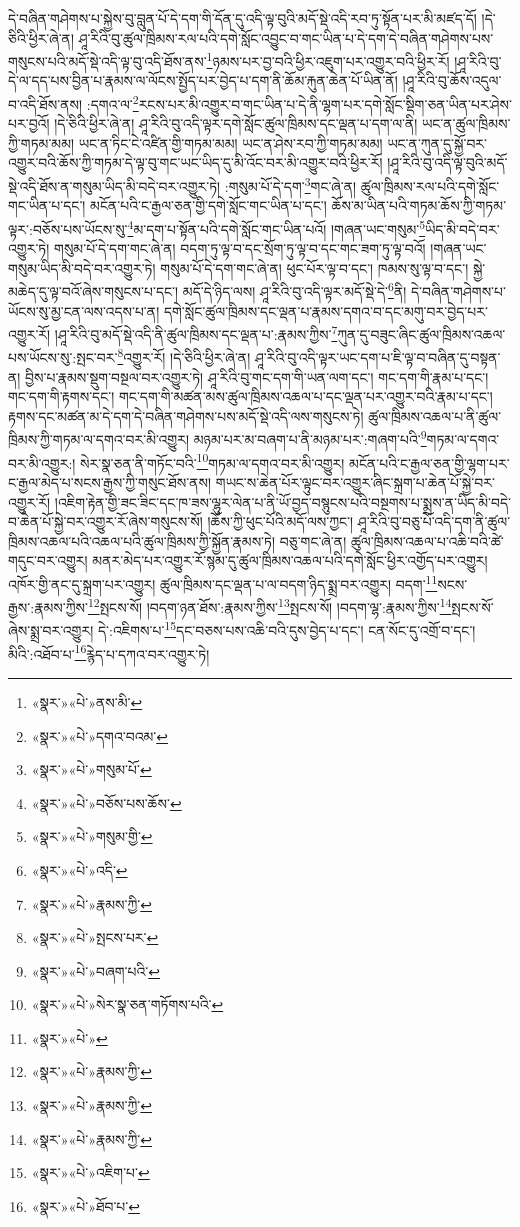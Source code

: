 དེ་བཞིན་གཤེགས་པ་སྐྱེས་བུ་བླུན་པོ་དེ་དག་གི་དོན་དུ་འདི་ལྟ་བུའི་མདོ་སྡེ་འདི་རབ་ཏུ་སྟོན་པར་མི་མཛད་དོ། །དེ་ཅིའི་ཕྱིར་ཞེ་ན། ཤཱ་རིའི་བུ་ཚུལ་ཁྲིམས་རལ་པའི་དགེ་སློང་འབྱུང་བ་གང་ཡིན་པ་དེ་དག་དེ་བཞིན་གཤེགས་པས་གསུངས་པའི་མདོ་སྡེ་འདི་ལྟ་བུ་འདི་ཐོས་ནས་\footnote{«སྣར་»«པེ་»ནས་མི་}ཉམས་པར་བྱ་བའི་ཕྱིར་འཇུག་པར་འགྱུར་བའི་ཕྱིར་རོ། །ཤཱ་རིའི་བུ་དེ་ལ་དད་པས་བྱིན་པ་རྣམས་ལ་ལོངས་སྤྱོད་པར་བྱེད་པ་དག་ནི་ཆོམ་རྐུན་ཆེན་པོ་ཡིན་ནོ། །ཤཱ་རིའི་བུ་ཆོས་འདུལ་བ་འདི་ཐོས་ནས། :དགའ་ལ་\footnote{«སྣར་»«པེ་»དགའ་བའམ་}རངས་པར་མི་འགྱུར་བ་གང་ཡིན་པ་དེ་ནི་ལྷག་པར་དགེ་སློང་སྡིག་ཅན་ཡིན་པར་ཤེས་པར་བྱའོ། །དེ་ཅིའི་ཕྱིར་ཞེ་ན། ཤཱ་རིའི་བུ་འདི་ལྟར་དགེ་སློང་ཚུལ་ཁྲིམས་དང་ལྡན་པ་དག་ལ་ནི། ཡང་ན་ཚུལ་ཁྲིམས་ཀྱི་གཏམ་མམ། ཡང་ན་ཏིང་ངེ་འཛིན་གྱི་གཏམ་མམ། ཡང་ན་ཤེས་རབ་ཀྱི་གཏམ་མམ། ཡང་ན་ཀུན་དུ་སྐྱོ་བར་འགྱུར་བའི་ཆོས་ཀྱི་གཏམ་དེ་ལྟ་བུ་གང་ཡང་ཡིད་དུ་མི་འོང་བར་མི་འགྱུར་བའི་ཕྱིར་རོ། །ཤཱ་རིའི་བུ་འདི་ལྟ་བུའི་མདོ་སྡེ་འདི་ཐོས་ན་གསུམ་ཡིད་མི་བདེ་བར་འགྱུར་ཏེ། :གསུམ་པོ་དེ་དག་\footnote{«སྣར་»«པེ་»གསུམ་པོ་}གང་ཞེ་ན། ཚུལ་ཁྲིམས་རལ་པའི་དགེ་སློང་གང་ཡིན་པ་དང་། མངོན་པའི་ང་རྒྱལ་ཅན་གྱི་དགེ་སློང་གང་ཡིན་པ་དང་། ཆོས་མ་ཡིན་པའི་གཏམ་ཆོས་ཀྱི་གཏམ་ལྟར་:བཅོས་པས་ཡོངས་སུ་\footnote{«སྣར་»«པེ་»བཅོས་པས་ཆོས་}མ་དག་པ་སྟོན་པའི་དགེ་སློང་གང་ཡིན་པའོ། །གཞན་ཡང་གསུམ་\footnote{«སྣར་»«པེ་»གསུམ་གྱི་}ཡིད་མི་བདེ་བར་འགྱུར་ཏེ། གསུམ་པོ་དེ་དག་གང་ཞེ་ན། བདག་ཏུ་ལྟ་བ་དང་སྲོག་ཏུ་ལྟ་བ་དང་གང་ཟག་ཏུ་ལྟ་བའོ། །གཞན་ཡང་གསུམ་ཡིད་མི་བདེ་བར་འགྱུར་ཏེ། གསུམ་པོ་དེ་དག་གང་ཞེ་ན། ཕུང་པོར་ལྟ་བ་དང་། ཁམས་སུ་ལྟ་བ་དང་། སྐྱེ་མཆེད་དུ་ལྟ་བའོ་ཞེས་གསུངས་པ་དང་། མདོ་དེ་ཉིད་ལས། ཤཱ་རིའི་བུ་འདི་ལྟར་མདོ་སྡེ་དེ་\footnote{«སྣར་»«པེ་»འདི་}ནི། དེ་བཞིན་གཤེགས་པ་ཡོངས་སུ་མྱ་ངན་ལས་འདས་པ་ན། དགེ་སློང་ཚུལ་ཁྲིམས་དང་ལྡན་པ་རྣམས་དགའ་བ་དང་མགུ་བར་བྱེད་པར་འགྱུར་རོ། །ཤཱ་རིའི་བུ་མདོ་སྡེ་འདི་ནི་ཚུལ་ཁྲིམས་དང་ལྡན་པ་:རྣམས་ཀྱིས་\footnote{«སྣར་»«པེ་»རྣམས་ཀྱི་}ཀུན་དུ་བཟུང་ཞིང་ཚུལ་ཁྲིམས་འཆལ་པས་ཡོངས་སུ་:སྤང་བར་\footnote{«སྣར་»«པེ་»སྤངས་པར་}འགྱུར་རོ། །དེ་ཅིའི་ཕྱིར་ཞེ་ན། ཤཱ་རིའི་བུ་འདི་ལྟར་ཡང་དག་པ་ཇི་ལྟ་བ་བཞིན་དུ་བསྟན་ན། བྱིས་པ་རྣམས་སྡུག་བསྔལ་བར་འགྱུར་ཏེ། ཤཱ་རིའི་བུ་གང་དག་གི་ཡན་ལག་དང་། གང་དག་གི་རྣམ་པ་དང་། གང་དག་གི་རྟགས་དང་། གང་དག་གི་མཚན་མས་ཚུལ་ཁྲིམས་འཆལ་པ་དང་ལྡན་པར་འགྱུར་བའི་རྣམ་པ་དང་། རྟགས་དང་མཚན་མ་དེ་དག་དེ་བཞིན་གཤེགས་པས་མདོ་སྡེ་འདི་ལས་གསུངས་ཏེ། ཚུལ་ཁྲིམས་འཆལ་པ་ནི་ཚུལ་ཁྲིམས་ཀྱི་གཏམ་ལ་དགའ་བར་མི་འགྱུར། མཉམ་པར་མ་བཞག་པ་ནི་མཉམ་པར་:གཞག་པའི་\footnote{«སྣར་»«པེ་»བཞག་པའི་}གཏམ་ལ་དགའ་བར་མི་འགྱུར:། སེར་སྣ་ཅན་ནི་གཏོང་བའི་\footnote{«སྣར་»«པེ་»སེར་སྣ་ཅན་གཏོགས་པའི་}གཏམ་ལ་དགའ་བར་མི་འགྱུར། མངོན་པའི་ང་རྒྱལ་ཅན་གྱི་ལྷག་པར་ང་རྒྱལ་མེད་པ་སངས་རྒྱས་ཀྱི་གསུང་ཐོས་ནས། གཡང་ས་ཆེན་པོར་ལྟུང་བར་འགྱུར་ཞིང་སྐྲག་པ་ཆེན་པོ་སྐྱེ་བར་འགྱུར་རོ། །འཇིག་རྟེན་གྱི་ཟང་ཟིང་དང་ཁ་ཟས་ལྷུར་ལེན་པ་ནི་ཡོ་བྱད་བསྙུངས་པའི་བསྔགས་པ་སྨྲས་ན་ཡིད་མི་བདེ་བ་ཆེན་པོ་སྐྱེ་བར་འགྱུར་རོ་ཞེས་གསུངས་སོ། །ཆོས་ཀྱི་ཕུང་པོའི་མདོ་ལས་ཀྱང་། ཤཱ་རིའི་བུ་བཅུ་པོ་འདི་དག་ནི་ཚུལ་ཁྲིམས་འཆལ་པའི་འཆལ་པའི་ཚུལ་ཁྲིམས་ཀྱི་སྐྱོན་རྣམས་ཏེ། བཅུ་གང་ཞེ་ན། ཚུལ་ཁྲིམས་འཆལ་པ་འཆི་བའི་ཚེ་གདུང་བར་འགྱུར། མནར་མེད་པར་འགྱུར་རོ་སྙམ་དུ་ཚུལ་ཁྲིམས་འཆལ་པའི་དགེ་སློང་ཕྱིར་འགྱོད་པར་འགྱུར། འཁོར་གྱི་ནང་དུ་སྐྲག་པར་འགྱུར། ཚུལ་ཁྲིམས་དང་ལྡན་པ་ལ་བདག་ཉིད་སྨྲ་བར་འགྱུར། བདག་\footnote{«སྣར་»«པེ་»}སངས་རྒྱས་:རྣམས་ཀྱིས་\footnote{«སྣར་»«པེ་»རྣམས་ཀྱི་}སྤངས་སོ། །བདག་ཉན་ཐོས་:རྣམས་ཀྱིས་\footnote{«སྣར་»«པེ་»རྣམས་ཀྱི་}སྤངས་སོ། །བདག་ལྷ་:རྣམས་ཀྱིས་\footnote{«སྣར་»«པེ་»རྣམས་ཀྱི་}སྤངས་སོ་ཞེས་སྨྲ་བར་འགྱུར། དེ་:འཇིགས་པ་\footnote{«སྣར་»«པེ་»འཇིག་པ་}དང་བཅས་པས་འཆི་བའི་དུས་བྱེད་པ་དང་། ངན་སོང་དུ་འགྲོ་བ་དང་། མིའི་:འཐོབ་པ་\footnote{«སྣར་»«པེ་»ཐོབ་པ་}རྙེད་པ་དཀའ་བར་འགྱུར་ཏེ། 